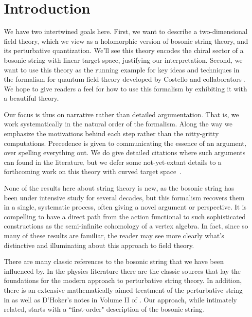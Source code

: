 
\section{Introduction}

We have two intertwined goals here.
First, we want to describe a two-dimensional field theory,
which we view as a holomorphic version of bosonic string theory,
and its perturbative quantization.
We'll see this theory encodes the chiral sector of a bosonic string with linear target space,
justifying our interpretation.
Second, we want to use this theory as the running example for key ideas and techniques in the formalism for quantum field theory developed by Costello and collaborators \cite{CosBook, CG1,CG2, LL1, GG1, GLL, LiVA}.
We hope to give readers a feel for how to use this formalism by exhibiting it with a beautiful theory.

Our focus is thus on narrative rather than detailed argumentation.
That is, we work systematically in the natural order of the formalism. 
Along the way we emphasize the motivations behind each step rather than the nitty-gritty computations. 
Precedence is given to communicating the essence of an argument, over spelling everything out.
We do give detailed citations where such arguments can found in the literature,
but we defer some not-yet-extant details to a forthcoming work on this theory with curved target space~\cite{GWcurved}.

None of the results here about string theory is new, 
as the bosonic string has been under intensive study for several decades,
but this formalism recovers them in a single, systematic process,
often giving a novel argument or perspective.
It is compelling to have a direct path from the action functional to such sophisticated constructions as the semi-infinite cohomology of a vertex algebra.
In fact, since so many of these results are familiar,
the reader may see more clearly what's distinctive and illuminating about this approach to field theory.

There are many classic references to the bosonic string that we have been influenced by.
In the physics literature there are the classic sources \cite{GSW1, GSW2, polchinski} that lay the foundations for the modern approach to perturbative string theory. 
In addition, there is an extensive mathematically aimed treatment of the perturbative string in \cite{DP} as well as D'Hoker's notes in Volume II of \cite{IAScourse}.
Our approach, while intimately related, starts with a ``first-order" description of the bosonic string. 

